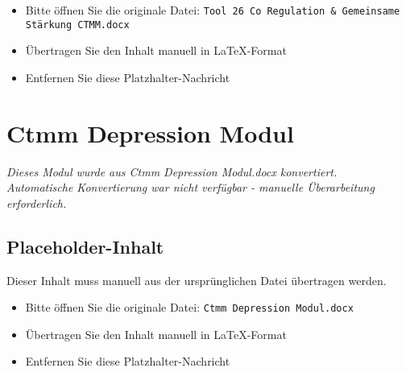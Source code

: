 \begin{itemize}
\item Bitte öffnen Sie die originale Datei: \texttt{Tool 26 Co Regulation & Gemeinsame Stärkung CTMM.docx}
\item Übertragen Sie den Inhalt manuell in LaTeX-Format
\item Entfernen Sie diese Platzhalter-Nachricht
\end{itemize}




\section{Ctmm Depression Modul}
\label{sec:ctmm-depression-modul}

\begin{center}
\textit{Dieses Modul wurde aus Ctmm Depression Modul.docx konvertiert.\\
Automatische Konvertierung war nicht verfügbar - manuelle Überarbeitung erforderlich.}
\end{center}


\subsection{Placeholder-Inhalt}

Dieser Inhalt muss manuell aus der ursprünglichen Datei übertragen werden.

\begin{itemize}
\item Bitte öffnen Sie die originale Datei: \texttt{Ctmm Depression Modul.docx}
\item Übertragen Sie den Inhalt manuell in LaTeX-Format
\item Entfernen Sie diese Platzhalter-Nachricht
\end{itemize}




